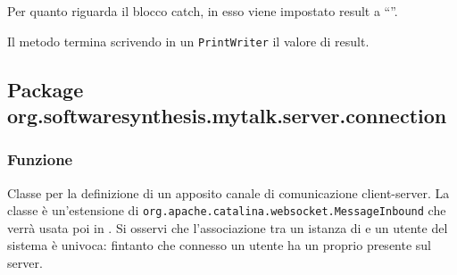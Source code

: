 \begin{description}
	Per quanto riguarda il blocco catch, in esso viene impostato result a ``''.
	
	Il metodo termina scrivendo in un \texttt{PrintWriter} il valore di result.
\end{description}


\subsection{Package org.softwaresynthesis.mytalk.server.connection}\label{sec:connection}


\subsubsection*{Funzione}
Classe per la definizione di un apposito canale di comunicazione client-server. La classe è un'estensione di \texttt{org.apache.catalina.websocket.MessageInbound} che verrà usata poi in . Si osservi che l'associazione tra un istanza di  e un utente del sistema è univoca: fintanto che connesso un utente ha un proprio  presente sul server.

